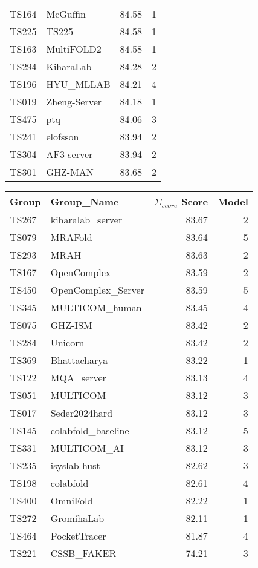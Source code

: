 \begin{table*}[ht]
\begin{minipage}[t]{0.48\textwidth}
\begin{tabular}{llrr}
TS164 & McGuffin & 84.58 & 1 \\ 
TS225 & TS225 & 84.58 & 1 \\ 
TS163 & MultiFOLD2 & 84.58 & 1 \\ 
TS294 & KiharaLab & 84.28 & 2 \\ 
TS196 & HYU\_MLLAB & 84.21 & 4 \\ 
TS019 & Zheng-Server & 84.18 & 1 \\ 
TS475 & ptq & 84.06 & 3 \\ 
TS241 & elofsson & 83.94 & 2 \\ 
TS304 & AF3-server & 83.94 & 2 \\ 
TS301 & GHZ-MAN & 83.68 & 2 \\ 
\bottomrule
\end{tabular}
\end{minipage}
\hfill
\begin{minipage}[t]{0.48\textwidth}
\centering
\begin{tabular}{llrr}
\toprule
Group & Group\_Name & $\Sigma_{score}$ Score & Model \\ 
\midrule
TS267 & kiharalab\_server & 83.67 & 2 \\ 
TS079 & MRAFold & 83.64 & 5 \\ 
TS293 & MRAH & 83.63 & 2 \\ 
TS167 & OpenComplex & 83.59 & 2 \\ 
TS450 & OpenComplex\_Server & 83.59 & 5 \\ 
TS345 & MULTICOM\_human & 83.45 & 4 \\ 
TS075 & GHZ-ISM & 83.42 & 2 \\ 
TS284 & Unicorn & 83.42 & 2 \\ 
TS369 & Bhattacharya & 83.22 & 1 \\ 
TS122 & MQA\_server & 83.13 & 4 \\ 
TS051 & MULTICOM & 83.12 & 3 \\ 
TS017 & Seder2024hard & 83.12 & 3 \\ 
TS145 & colabfold\_baseline & 83.12 & 5 \\ 
TS331 & MULTICOM\_AI & 83.12 & 3 \\ 
TS235 & isyslab-hust & 82.62 & 3 \\ 
TS198 & colabfold & 82.61 & 4 \\ 
TS400 & OmniFold & 82.22 & 1 \\ 
TS272 & GromihaLab & 82.11 & 1 \\ 
TS464 & PocketTracer & 81.87 & 4 \\ 
TS221 & CSSB\_FAKER & 74.21 & 3 \\ 

\end{tabular}
\end{minipage}
\end{table*}
